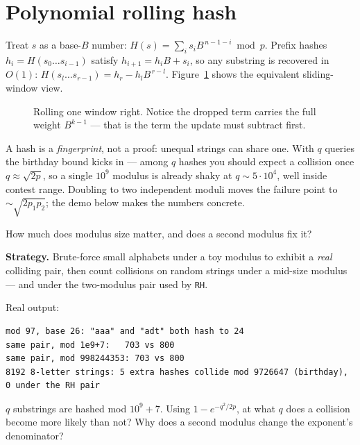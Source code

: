 \section{Polynomial rolling hash}\label{sec:rhash}
Treat $s$ as a base-$B$ number: $H(s) = \sum_i s_i B^{\,n-1-i}
\bmod p$. Prefix hashes $h_i = H(s_0\dots s_{i-1})$ satisfy
$h_{i+1} = h_i B + s_i$, so any substring is recovered in $O(1)$:
$H(s_l\dots s_{r-1}) = h_r - h_l B^{\,r-l}$. Figure~\ref{fig:rhash}
shows the equivalent sliding-window view.
\begin{figure}[ht]\centering

\caption{Rolling one window right. Notice the dropped term carries
the full weight $B^{k-1}$ --- that is the term the update must
subtract first.}
\label{fig:rhash}
\end{figure}


A hash is a \emph{fingerprint}, not a proof: unequal strings can
share one. With $q$ queries the birthday bound kicks in --- among
$q$ hashes you should expect a collision once
$q \approx \sqrt{2p}$, so a single $10^9$ modulus is already
shaky at $q \sim 5{\cdot}10^4$, well inside contest range.
Doubling to two independent moduli moves the failure point to
$\sim\sqrt{2 p_1 p_2}$; the demo below makes the numbers concrete.

\begin{example}\label{ex:collide}
How much does modulus size matter, and does a second modulus fix it?
\par\smallskip
\textbf{Strategy.} Brute-force small alphabets under a toy modulus
to exhibit a \emph{real} colliding pair, then count collisions on
random strings under a mid-size modulus --- and under the
two-modulus pair used by \texttt{RH}.
\par\smallskip
\begin{solution}

Real output:
\begin{lstlisting}[numbers=none]
mod 97, base 26: "aaa" and "adt" both hash to 24
same pair, mod 1e9+7:   703 vs 800
same pair, mod 998244353: 703 vs 800
8192 8-letter strings: 5 extra hashes collide mod 9726647 (birthday), 0 under the RH pair
\end{lstlisting}
\end{solution}
\end{example}
\begin{exercise}[medium]\label{exr:birthday}
$q$ substrings are hashed mod $10^9{+}7$. Using
$1 - e^{-q^2/2p}$, at what $q$ does a collision become more likely
than not? Why does a second modulus change the exponent's
denominator?
\end{exercise}

